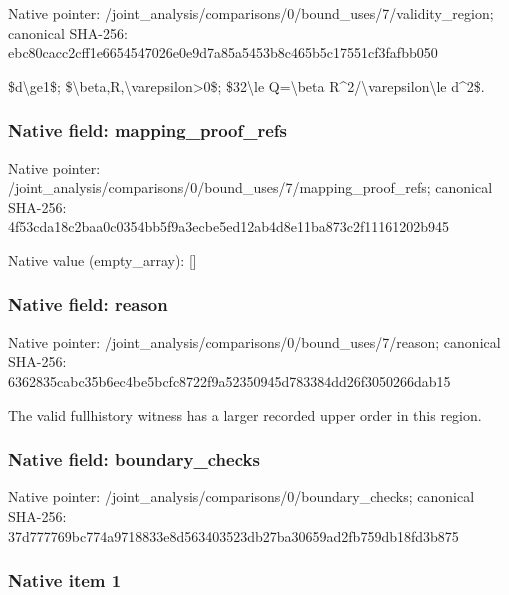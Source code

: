 \documentclass[10pt,a4paper]{article}
\begin{document}
Native pointer: /joint\_analysis/comparis\allowbreak{}ons/0/bound\_uses/7/valid\allowbreak{}ity\_region; canonical SHA-256: ebc80cacc2cff1e665454702\allowbreak{}6e0e9d7a85a5453b8c465b5c\allowbreak{}17551cf3fafbb050


\$d\textbackslash{}ge1\$; \$\textbackslash{}beta,R,\textbackslash{}varepsilon>0\$; \$32\textbackslash{}le Q=\textbackslash{}beta R\textasciicircum{}2/\textbackslash{}varepsilon\textbackslash{}le d\textasciicircum{}2\$.


\subsubsection{Native field: mapping\_proof\_refs}


Native pointer: /joint\_analysis/comparis\allowbreak{}ons/0/bound\_uses/7/mappi\allowbreak{}ng\_proof\_refs; canonical SHA-256: 4f53cda18c2baa0c0354bb5f\allowbreak{}9a3ecbe5ed12ab4d8e11ba87\allowbreak{}3c2f11161202b945



Native value (empty\_array): []



\subsubsection{Native field: reason}


Native pointer: /joint\_analysis/comparis\allowbreak{}ons/0/bound\_uses/7/reaso\allowbreak{}n; canonical SHA-256: 6362835cabc35b6ec4be5bcf\allowbreak{}c8722f9a52350945d783384d\allowbreak{}d26f3050266dab15


The valid fullhistory witness has a larger recorded upper order in this region.


\subsubsection{Native field: boundary\_checks}


Native pointer: /joint\_analysis/comparis\allowbreak{}ons/0/boundary\_checks; canonical SHA-256: 37d777769bc774a9718833e8\allowbreak{}d563403523db27ba30659ad2\allowbreak{}fb759db18fd3b875



\subsubsection{Native item 1}
\end{document}
